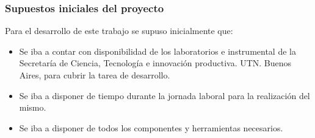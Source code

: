 %
%
%
%
%
%
%
%

\subsubsection{Supuestos iniciales del proyecto}

Para el desarrollo de este trabajo se supuso inicialmente que:

\begin{itemize}
	\item Se iba a contar con disponibilidad de los laboratorios e instrumental de la  Secretaría de Ciencia, Tecnología e innovación productiva. UTN. Buenos Aires, para cubrir la tarea de desarrollo.
	\item Se iba a disponer de tiempo durante la jornada laboral para la realización del mismo. 
	\item Se iba a disponer de todos los componentes y herramientas necesarios.
\end{itemize}

